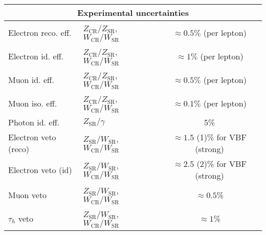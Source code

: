 \begin{table*}[htbp]
{\begin{tabular}{l l c}
     \hline
     \multicolumn{3}{c}{Experimental uncertainties}  \\ %
     \hline
     Electron reco. eff.       & $Z_{\mathrm{CR}}/Z_{\mathrm{SR}}$, $W_{\mathrm{CR}}/W_{\mathrm{SR}}$ & $\approx0.5\%$ (per lepton)  \\
     Electron id. eff.         & $Z_{\mathrm{CR}}/Z_{\mathrm{SR}}$, $W_{\mathrm{CR}}/W_{\mathrm{SR}}$ & $\approx1\%$ (per lepton) \\
     Muon id. eff.             & $Z_{\mathrm{CR}}/Z_{\mathrm{SR}}$, $W_{\mathrm{CR}}/W_{\mathrm{SR}}$ & $\approx0.5\%$ (per lepton)  \\
     Muon iso. eff.            & $Z_{\mathrm{CR}}/Z_{\mathrm{SR}}$, $W_{\mathrm{CR}}/W_{\mathrm{SR}}$ & $\approx0.1\%$ (per lepton)  \\
     Photon id. eff.           & $Z_{\mathrm{SR}}/\gamma$       & 5\% \\
     
     Electron veto (reco)      & $Z_{\mathrm{SR}}/W_{\mathrm{SR}}$, $W_{\mathrm{CR}}/W_{\mathrm{SR}}$ & $\approx1.5$ (1)\% for VBF (strong) \\
     Electron veto (id)        & $Z_{\mathrm{SR}}/W_{\mathrm{SR}}$, $W_{\mathrm{CR}}/W_{\mathrm{SR}}$ & $\approx2.5$ (2)\% for VBF (strong) \\
     Muon veto                 & $Z_{\mathrm{SR}}/W_{\mathrm{SR}}$, $W_{\mathrm{CR}}/W_{\mathrm{SR}}$ & $\approx0.5$\% \\
     $\tau_{h}$ veto           & $Z_{\mathrm{SR}}/W_{\mathrm{SR}}$, $W_{\mathrm{CR}}/W_{\mathrm{SR}}$ & $\approx1$\% \\


\end{tabular}}
\end{table*}
